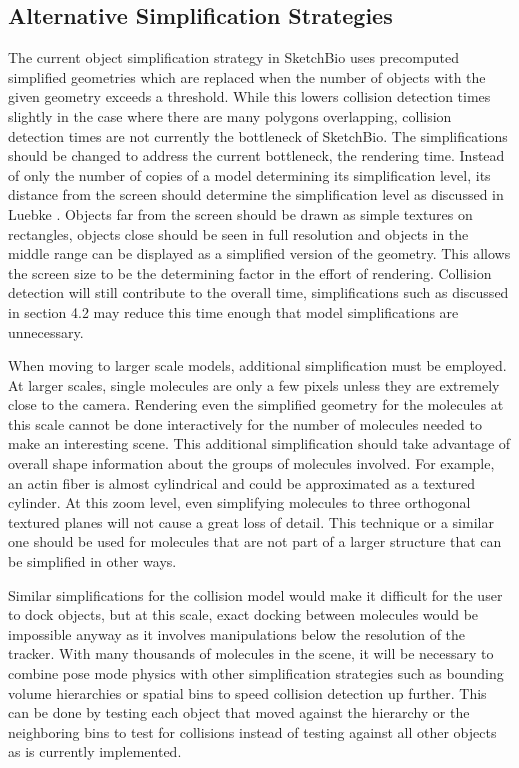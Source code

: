 \documentclass{article} %
\begin{document}
\subsection{Alternative Simplification Strategies}
\label{sec:simplification_strategies}
The current object simplification strategy in SketchBio uses precomputed simplified geometries which are replaced when the number of objects with the given geometry exceeds a threshold.  While this lowers collision detection times slightly in the case where there are many polygons overlapping, collision detection times are not currently the bottleneck of SketchBio.  The simplifications should be changed to address the current bottleneck, the rendering time.  Instead of only the number of copies of a model determining its simplification level, its distance from the screen should determine the simplification level as discussed in Luebke \cite{luebke2003level}.  Objects far from the screen should be drawn as simple textures on rectangles, objects close should be seen in full resolution and objects in the middle range can be displayed as a simplified version of the geometry.  This allows the screen size to be the determining factor in the effort of rendering.  Collision detection will still contribute to the overall time, simplifications such as discussed in section 4.2 may reduce this time enough that model simplifications are unnecessary.

When moving to larger scale models, additional simplification must be employed.  At larger scales, single molecules are only a few pixels unless they are extremely close to the camera.  Rendering even the simplified geometry for the molecules at this scale cannot be done interactively for the number of molecules needed to make an interesting scene.  This additional simplification should take advantage of overall shape information about the groups of molecules involved.  For example, an actin fiber is almost cylindrical and could be approximated as a textured cylinder.  At this zoom level, even simplifying molecules to three orthogonal textured planes will not cause a great loss of detail.  This technique or a similar one should be used for molecules that are not part of a larger structure that can be simplified in other ways.

Similar simplifications for the collision model would make it difficult for the user to dock objects, but at this scale, exact docking between molecules would be impossible anyway as it involves manipulations below the resolution of the tracker.  With many thousands of molecules in the scene, it will be necessary to combine pose mode physics with other simplification strategies such as bounding volume hierarchies or spatial bins to speed collision detection up further.  This can be done by testing each object that moved against the hierarchy or the neighboring bins to test for collisions instead of testing against all other objects as is currently implemented.
\end{document}
